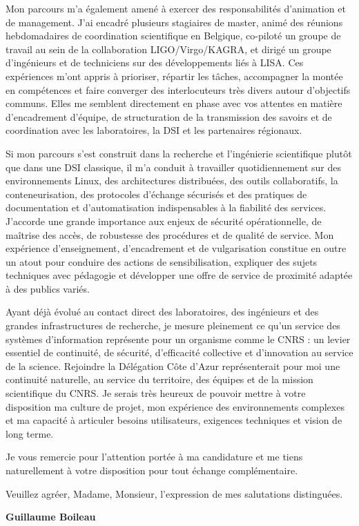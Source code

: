 \documentclass[10pt,a4paper]{../_shared/altacv}
\begin{document}
{Mon parcours m’a également amené à exercer des responsabilités d’animation et de management. J’ai encadré plusieurs stagiaires de master, animé des réunions hebdomadaires de coordination scientifique en Belgique, co-piloté un groupe de travail au sein de la collaboration LIGO/Virgo/KAGRA, et dirigé un groupe d’ingénieurs et de techniciens sur des développements liés à LISA. Ces expériences m’ont appris à prioriser, répartir les tâches, accompagner la montée en compétences et faire converger des interlocuteurs très divers autour d’objectifs communs. Elles me semblent directement en phase avec vos attentes en matière d’encadrement d’équipe, de structuration de la transmission des savoirs et de coordination avec les laboratoires, la DSI et les partenaires régionaux.

Si mon parcours s’est construit dans la recherche et l’ingénierie scientifique plutôt que dans une DSI classique, il m’a conduit à travailler quotidiennement sur des environnements Linux, des architectures distribuées, des outils collaboratifs, la conteneurisation, des protocoles d’échange sécurisés et des pratiques de documentation et d’automatisation indispensables à la fiabilité des services. J’accorde une grande importance aux enjeux de sécurité opérationnelle, de maîtrise des accès, de robustesse des procédures et de qualité de service. Mon expérience d’enseignement, d’encadrement et de vulgarisation constitue en outre un atout pour conduire des actions de sensibilisation, expliquer des sujets techniques avec pédagogie et développer une offre de service de proximité adaptée à des publics variés.

Ayant déjà évolué au contact direct des laboratoires, des ingénieurs et des grandes infrastructures de recherche, je mesure pleinement ce qu’un service des systèmes d’information représente pour un organisme comme le CNRS : un levier essentiel de continuité, de sécurité, d’efficacité collective et d’innovation au service de la science. Rejoindre la Délégation Côte d’Azur représenterait pour moi une continuité naturelle, au service du territoire, des équipes et de la mission scientifique du CNRS. Je serais très heureux de pouvoir mettre à votre disposition ma culture de projet, mon expérience des environnements complexes et ma capacité à articuler besoins utilisateurs, exigences techniques et vision de long terme.

Je vous remercie pour l’attention portée à ma candidature et me tiens naturellement à votre disposition pour tout échange complémentaire.

Veuillez agréer, Madame, Monsieur, l’expression de mes salutations distinguées.

\textbf{Guillaume Boileau}

}

\end{document}
